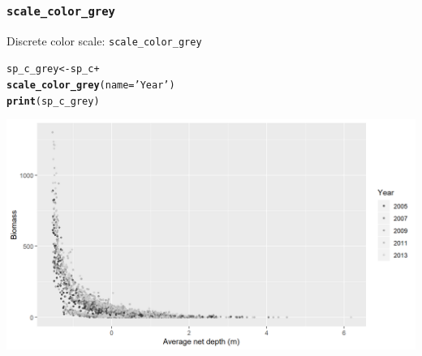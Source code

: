 \documentclass{beamer}\usepackage[]{graphicx}\usepackage[]{color}
\makeatletter
\newcommand{\hlstr}[1]{\textcolor[rgb]{0.192,0.494,0.8}{#1}}%
\newcommand{\hlopt}[1]{\textcolor[rgb]{0,0,0}{#1}}%
\newcommand{\hlstd}[1]{\textcolor[rgb]{0.345,0.345,0.345}{#1}}%
\newcommand{\hlkwb}[1]{\textcolor[rgb]{0.69,0.353,0.396}{#1}}%
\newcommand{\hlkwc}[1]{\textcolor[rgb]{0.333,0.667,0.333}{#1}}%
\newcommand{\hlkwd}[1]{\textcolor[rgb]{0.737,0.353,0.396}{\textbf{#1}}}%
\newenvironment{kframe}{%
 \def\at@end@of@kframe{}%
 \ifinner\ifhmode%
  \def\at@end@of@kframe{\end{minipage}}%
  \begin{minipage}{\columnwidth}%
 \fi\fi%
 \def\FrameCommand##1{\hskip\@totalleftmargin \hskip-\fboxsep
 \colorbox{shadecolor}{##1}\hskip-\fboxsep
     \hskip-\linewidth \hskip-\@totalleftmargin \hskip\columnwidth}%
 \MakeFramed {\advance\hsize-\width
   \@totalleftmargin\z@ \linewidth\hsize
   \@setminipage}}%
 {\par\unskip\endMakeFramed%
 \at@end@of@kframe}
\newenvironment{knitrout}{}{} %
\makeatother
\begin{document}
\subsubsection{\lstinline{scale_color_grey}}
\begin{frame}[fragile]{Discrete color scale: \lstinline{scale_color_grey}}
\begin{knitrout}\footnotesize
{}\color{fgcolor}\begin{kframe}
\begin{alltt}
\hlstd{sp_c_grey} \hlkwb{<-} \hlstd{sp_c} \hlopt{+}
  \hlkwd{scale_color_grey}\hlstd{(}\hlkwc{name}\hlstd{=}\hlstr{'Year'}\hlstd{)}
\hlkwd{print}\hlstd{(sp_c_grey)}
\end{alltt}
\end{kframe}

{\centering \includegraphics[width=.9\linewidth]{figure/sp_discrete_color5-1} 

}



\end{knitrout}
\end{frame}
\end{document}
